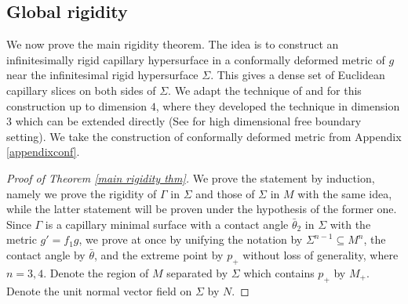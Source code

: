\documentclass[11pt,letterpaper]{amsart}
\begin{document}
\subsection{Global rigidity} We now prove the main rigidity theorem. The idea is to construct an infinitesimally rigid capillary hypersurface in a conformally deformed metric of $g$ near the infinitesimal rigid hypersurface $\Sigma$. This gives a dense set of Euclidean capillary slices on both sides of $\Sigma$. We adapt the technique of \cite{carlotto2016effective} and \cite{liu20133} for this construction up to dimension $4$, where they developed the technique in dimension $3$ which can be extended directly (See \cite{li2024dihedral} for high dimensional free boundary setting). We take the construction of conformally deformed metric from Appendix \ref{appendixconf}.
\begin{proof}[Proof of Theorem \ref{main rigidity thm}] We prove the statement by induction, namely we prove the rigidity of $\Gamma$ in $\Sigma$ and those of $\Sigma$ in $M$ with the same idea, while the latter statement will be proven under the hypothesis of the former one. Since $\Gamma$ is a capillary minimal surface with a contact angle $\bar{\theta}_{2}$ in $\Sigma$ with the metric $g' = f_{1} g$, we prove at once by unifying the notation by $\Sigma^{n-1} \subseteq M^{n}$, the contact angle by $\bar{\theta}$, and the extreme point by $p_{+}$ without loss of generality, where $n=3,4$. Denote the region of $M$ separated by $\Sigma$ which contains $p_{+}$ by $M_{+}$. Denote the unit normal vector field on $\Sigma$ by $N$.


\end{proof}
\end{document}
